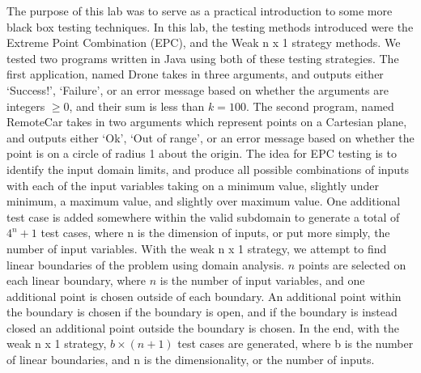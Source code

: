 The purpose of this lab was to serve as a practical
introduction to some more black box testing techniques. In this lab, the
testing methods introduced were the Extreme Point Combination (EPC), and the
Weak n x 1 strategy methods. We tested two programs written in Java using both
of these testing strategies. The first application, named Drone takes in three
arguments, and outputs either `Success!', `Failure', or an error message based
on whether the arguments are integers $\geq 0$, and their sum is less than
$k=100$. The second program, named RemoteCar takes in two arguments which
represent points on a Cartesian plane, and outputs either `Ok', `Out of range',
or an error message based on whether the point is on a circle of radius 1 about
the origin. The idea for EPC testing is to identify the input domain limits,
and produce all possible combinations of inputs with each of the input
variables taking on a minimum value, slightly under minimum, a maximum value,
and slightly over maximum value. One additional test case is added somewhere
within the valid subdomain to generate a total of $4^n + 1$ test cases, where
n is the dimension of inputs, or put more simply, the number of input
variables. With the weak n x 1 strategy, we attempt to find linear boundaries 
of the problem using domain analysis. $n$ points are selected on each linear
boundary, where $n$ is the number of input variables, and one additional point 
is chosen outside of each boundary. An additional point within the boundary is
chosen if the boundary is open, and if the boundary is instead closed an 
additional point outside the boundary is chosen. In the end, with the weak
n x 1 strategy, $b \times (n + 1)$ test cases are generated, where b is the 
number of linear boundaries, and n is the dimensionality, or the number of
inputs.
